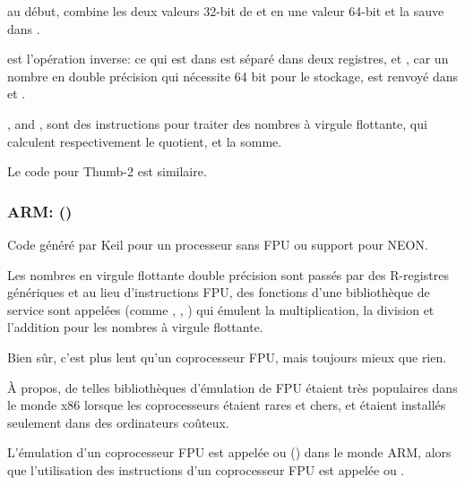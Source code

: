  au début, combine les deux valeurs 32-bit de  et 
en une valeur 64-bit et la sauve dans .

 est l'opération inverse: ce qui est dans  est séparé
dans deux registres,  et , car un nombre en double précision qui
nécessite 64 bit pour le stockage, est renvoyé dans  et .

,  and , 
sont des instructions pour traiter des nombres à virgule flottante, qui calculent
respectivement le \gls{quotient},  et la somme.

Le code pour Thumb-2 est similaire.

\subsubsection{ARM: \OptimizingKeilVI (\ThumbMode)}



Code généré par Keil pour un processeur sans FPU ou support pour NEON.

Les nombres en virgule flottante double précision sont passés par des R-registres
génériques et au lieu d'instructions FPU, des fonctions d'une bibliothèque de service
sont appelées (comme , , )
qui émulent la multiplication, la division et l'addition pour les nombres à virgule
flottante.

Bien sûr, c'est plus lent qu'un coprocesseur FPU, mais toujours mieux que rien.

À propos, de telles bibliothèques d'émulation de FPU étaient très populaires dans
le monde x86 lorsque les coprocesseurs étaient rares et chers, et étaient installés
seulement dans des ordinateurs coûteux.


L'émulation d'un coprocesseur FPU est appelée  ou  ()
dans le monde ARM, alors que l'utilisation des instructions d'un coprocesseur FPU
est appelée  ou .

\iffalse

